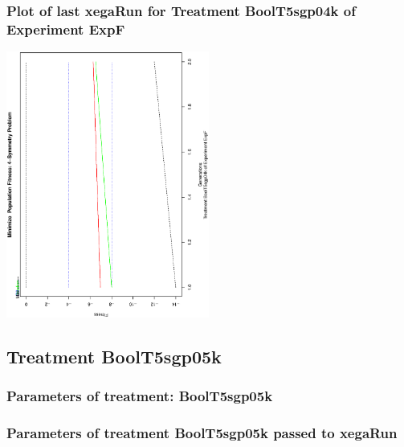 \documentclass[18pt,c]{beamer}
\makeatletter
\def\beamer@writeslidentry@miniframesoff{%
  \expandafter\beamer@ifempty\expandafter{\beamer@framestartpage}{}%
  {%
   \clearpage\beamer@notesactions%
  }
}
\newcommand*{\miniframesoff}{\let\beamer@writeslidentry=\beamer@writeslidentry@miniframesoff}
\makeatother
\begin{document}
 \begin{frame}
 \frametitle{ Plot of last xegaRun for Treatment BoolT5sgp04k of Experiment ExpF }
 \begin{center}
\includegraphics[width=0.5\textwidth, angle=-90]
{ExpFPlotPopStatsFigure002.eps}
 \end{center}
 \label{report/ExpFPlotPopStatsFigure002.eps}  
 \end{frame}

\miniframesoff
\subsection{Treatment BoolT5sgp05k}

 \begin{frame}
 \fontsize{8pt}{9pt}\selectfont
 \frametitle{  Parameters of treatment: BoolT5sgp05k 
 }

 \label{ExpFtParmTable012.tex}  
 \end{frame}


 \begin{frame}
 \fontsize{8pt}{9pt}\selectfont
 \frametitle{  Parameters of treatment BoolT5sgp05k passed to xegaRun
 }

 \label{ExpFtParmTable013.tex}  
 \end{frame}
\end{document}
